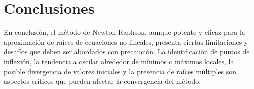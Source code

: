 \documentclass[conference]{IEEEtran}
\begin{document}
\section{Conclusiones}

En conclusión, el método de Newton-Raphson, aunque potente y eficaz para 
la aproximación de raíces de ecuaciones no lineales, presenta ciertas 
limitaciones y desafíos que deben ser abordados con precaución. La 
identificación de puntos de inflexión, la tendencia a oscilar alrededor 
de mínimos o máximos locales, la posible divergencia de valores iniciales 
y la presencia de raíces múltiples son aspectos críticos que pueden afectar 
la convergencia del método.


\end{document}
